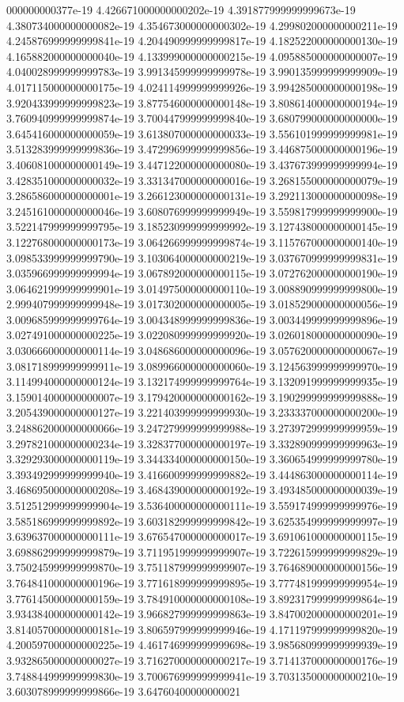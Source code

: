 000000000377e-19	4.426671000000000202e-19	4.391877999999999673e-19	4.380734000000000082e-19	4.354673000000000302e-19	4.299802000000000211e-19	4.245876999999999841e-19	4.204490999999999817e-19	4.182522000000000130e-19	4.165882000000000040e-19	4.133999000000000215e-19	4.095885000000000007e-19	4.040028999999999783e-19	3.991345999999999978e-19	3.990135999999999909e-19	4.017115000000000175e-19	4.024114999999999926e-19	3.994285000000000198e-19	3.920433999999999823e-19	3.877546000000000148e-19	3.808614000000000194e-19	3.760940999999999874e-19	3.700447999999999840e-19	3.680799000000000000e-19	3.645416000000000059e-19	3.613807000000000033e-19	3.556101999999999981e-19	3.513283999999999836e-19	3.472996999999999856e-19	3.446875000000000196e-19	3.406081000000000149e-19	3.447122000000000080e-19	3.437673999999999994e-19	3.428351000000000032e-19	3.331347000000000016e-19	3.268155000000000079e-19	3.286586000000000001e-19	3.266123000000000131e-19	3.292113000000000098e-19	3.245161000000000046e-19	3.608076999999999949e-19	3.559817999999999900e-19	3.522147999999999795e-19	3.185230999999999992e-19	3.127438000000000145e-19	3.122768000000000173e-19	3.064266999999999874e-19	3.115767000000000140e-19	3.098533999999999790e-19	3.103064000000000219e-19	3.037670999999999831e-19	3.035966999999999994e-19	3.067892000000000115e-19	3.072762000000000190e-19	3.064621999999999901e-19	3.014975000000000110e-19	3.008890999999999800e-19	2.999407999999999948e-19	3.017302000000000005e-19	3.018529000000000056e-19	3.009685999999999764e-19	3.004348999999999836e-19	3.003449999999999896e-19	3.027491000000000225e-19	3.022080999999999920e-19	3.026018000000000090e-19	3.030666000000000114e-19	3.048686000000000096e-19	3.057620000000000067e-19	3.081718999999999911e-19	3.089966000000000060e-19	3.124563999999999970e-19	3.114994000000000124e-19	3.132174999999999764e-19	3.132091999999999935e-19	3.159014000000000007e-19	3.179420000000000162e-19	3.190299999999999888e-19	3.205439000000000127e-19	3.221403999999999930e-19	3.233337000000000200e-19	3.248862000000000066e-19	3.247279999999999988e-19	3.273972999999999959e-19	3.297821000000000234e-19	3.328377000000000197e-19	3.332890999999999963e-19	3.329293000000000119e-19	3.344334000000000150e-19	3.360654999999999780e-19	3.393492999999999940e-19	3.416600999999999882e-19	3.444863000000000114e-19	3.468695000000000208e-19	3.468439000000000192e-19	3.493485000000000039e-19	3.512512999999999904e-19	3.536400000000000111e-19	3.559174999999999976e-19	3.585186999999999892e-19	3.603182999999999842e-19	3.625354999999999997e-19	3.639637000000000111e-19	3.676547000000000017e-19	3.691061000000000115e-19	3.698862999999999879e-19	3.711951999999999907e-19	3.722615999999999829e-19	3.750245999999999870e-19	3.751187999999999907e-19	3.764689000000000156e-19	3.764841000000000196e-19	3.771618999999999895e-19	3.777481999999999954e-19	3.776145000000000159e-19	3.784910000000000108e-19	3.892317999999999864e-19	3.934384000000000142e-19	3.966827999999999863e-19	3.847002000000000201e-19	3.814057000000000181e-19	3.806597999999999946e-19	4.171197999999999820e-19	4.200597000000000225e-19	4.461746999999999698e-19	3.985680999999999939e-19	3.932865000000000027e-19	3.716270000000000217e-19	3.714137000000000176e-19	3.748844999999999830e-19	3.700676999999999941e-19	3.703135000000000210e-19	3.603078999999999866e-19	3.64760400000000021